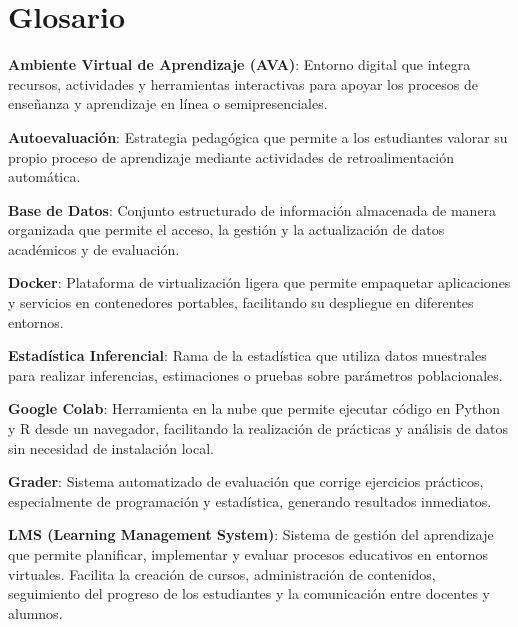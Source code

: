 \documentclass[letter,oneside,12pt,spanish]{report}
\begin{document}
\parskip=12pt
\tableofcontents                    

\newpage

\listoffigures                         %
\newpage

\chapter*{Glosario}

\begin{description}

\item \textbf{Ambiente Virtual de Aprendizaje (AVA)}: Entorno digital que integra recursos, actividades y herramientas interactivas para apoyar los procesos de enseñanza y aprendizaje en línea o semipresenciales.
\item \textbf{Autoevaluación}: Estrategia pedagógica que permite a los estudiantes valorar su propio proceso de aprendizaje mediante actividades de retroalimentación automática.
\item \textbf{Base de Datos}: Conjunto estructurado de información almacenada de manera organizada que permite el acceso, la gestión y la actualización de datos académicos y de evaluación.
\item \textbf{Docker}: Plataforma de virtualización ligera que permite empaquetar aplicaciones y servicios en contenedores portables, facilitando su despliegue en diferentes entornos.
\item \textbf{Estadística Inferencial}: Rama de la estadística que utiliza datos muestrales para realizar inferencias, estimaciones o pruebas sobre parámetros poblacionales.
\item \textbf{Google Colab}: Herramienta en la nube que permite ejecutar código en Python y R desde un navegador, facilitando la realización de prácticas y análisis de datos sin necesidad de instalación local.
\item \textbf{Grader}: Sistema automatizado de evaluación que corrige ejercicios prácticos, especialmente de programación y estadística, generando resultados inmediatos.
\item \textbf{LMS (Learning Management System)}: Sistema de gestión del aprendizaje que permite planificar, implementar y evaluar procesos educativos en entornos virtuales. Facilita la creación de cursos, administración de contenidos, seguimiento del progreso de los estudiantes y la comunicación entre docentes y alumnos.

\end{description}
\end{document}
